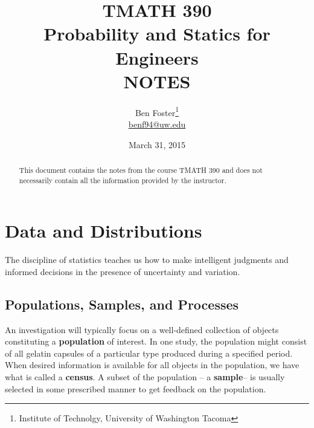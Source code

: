 \documentclass{article}
\begin{document}
{
	\title{TMATH 390 \\ Probability and Statics for Engineers \\ NOTES}
	\author{Ben Foster\thanks{
		Institute of Technolgy, University of Washington Tacoma} \\
		\url{benf94@uw.edu}
	}
	\date{March 31, 2015}
	\maketitle
	\thispagestyle{empty} %
	\begin{abstract}
	\begin{center}
		This document contains the notes from the course TMATH 390 and does not necessarily
		contain all the information provided by the instructor.
	\end{center}
	\end{abstract}
	\clearpage
	\tableofcontents
	\clearpage
	\setcounter{page}{1}
}
	
\section{Data and Distributions} %

The discipline of statistics teaches us how to make intelligent judgments and informed decisions in the presence of uncertainty and variation.

	\subsection{Populations, Samples, and Processes} %
	An investigation will typically focus on a well-defined collection of objects constituting a 
	\textbf{population} of interest. In one study, the population might consist of all gelatin capsules 
	of a particular type produced during a specified period. When desired information is available 
	for all objects in the population, we have what is called a \textbf{census}. A subset of the 
	population -- a \textbf{sample}-- is usually selected in some prescribed manner to get feedback 
	on the population.
	
\end{document}
